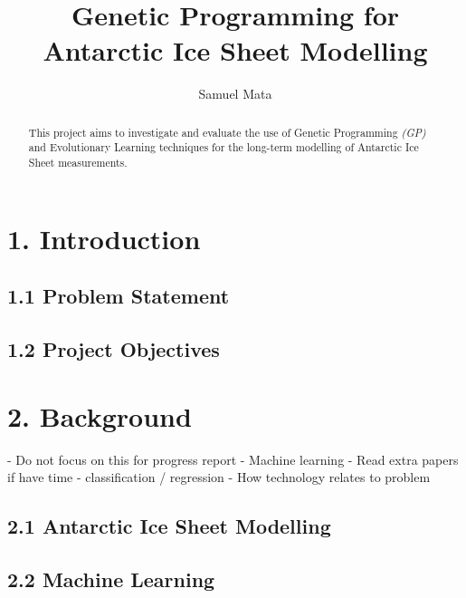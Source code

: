 \documentclass[11pt, a4paper, twoside, openright]{report}
\title{Genetic Programming for Antarctic Ice Sheet Modelling}
\author{Samuel Mata}
\date{}
\begin{document}
\frontmatter


\begin{abstract}
  This project aims to investigate and evaluate the use of Genetic
  Programming \textit{(GP)} and Evolutionary Learning techniques for
  the long-term modelling of Antarctic Ice Sheet measurements. 
\end{abstract}


\maketitle

\tableofcontents


\mainmatter


\chapter*{1. Introduction}
\section*{1.1 Problem Statement}
\section*{1.2 Project Objectives}


\chapter*{2. Background}
- Do not focus on this for progress report
- Machine learning
- Read extra papers if have time
- classification / regression
- How technology relates to problem

\section*{2.1 Antarctic Ice Sheet Modelling}

\section*{2.2 Machine Learning}
\end{document}

